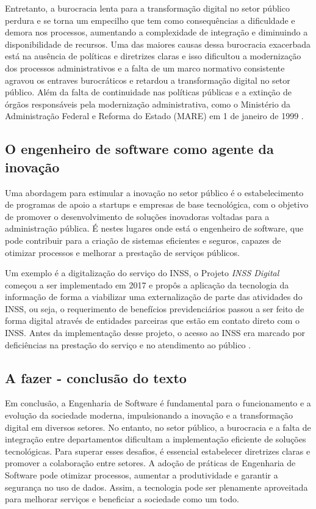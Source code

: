 \documentclass[12pt,oneside,a4paper,article]{abntex2}
\begin{document}
Entretanto, a burocracia lenta para a transformação digital no setor público perdura e se torna um empecilho que tem como consequências a dificuldade e demora nos processos, aumentando a complexidade de integração e diminuindo a disponibilidade de recursos. Uma das maiores causas dessa burocracia exacerbada está na ausência de políticas e diretrizes claras e isso dificultou a modernização dos processos administrativos e a falta de um marco normativo consistente agravou os entraves burocráticos e retardou a transformação digital no setor público. Além da falta de continuidade nas políticas públicas e a extinção de órgãos responsáveis pela modernização administrativa, como o Ministério da Administração Federal e Reforma do Estado (MARE) em 1 de janeiro de 1999 \cite{grin2015programa}.

\subsection{O engenheiro de software como agente da inovação}

Uma abordagem para estimular a inovação no setor público é o estabelecimento de programas de apoio a startups e empresas de base tecnológica, com o objetivo de promover o desenvolvimento de soluções inovadoras voltadas para a administração pública. É nestes lugares onde está o engenheiro de software, que pode contribuir para a criação de sistemas eficientes e seguros, capazes de otimizar processos e melhorar a prestação de serviços públicos.

Um exemplo é a digitalização do serviço do INSS, o Projeto \textit{INSS Digital} começou a ser implementado em 2017 e propôs a aplicação da tecnologia da informação de forma a viabilizar uma externalização de parte das atividades do INSS, ou seja, o requerimento de benefícios previdenciários passou a ser feito de forma digital através de entidades parceiras que estão em contato direto com o INSS. Antes da implementação desse projeto, o acesso ao INSS era marcado por deficiências na prestação do serviço e no atendimento ao público \cite{pinheiro2021transformaccao}.

\subsection{A fazer - conclusão do texto}

Em conclusão, a Engenharia de Software é fundamental para o funcionamento e a evolução da sociedade moderna, impulsionando a inovação e a transformação digital em diversos setores. No entanto, no setor público, a burocracia e a falta de integração entre departamentos dificultam a implementação eficiente de soluções tecnológicas. Para superar esses desafios, é essencial estabelecer diretrizes claras e promover a colaboração entre setores. A adoção de práticas de Engenharia de Software pode otimizar processos, aumentar a produtividade e garantir a segurança no uso de dados. Assim, a tecnologia pode ser plenamente aproveitada para melhorar serviços e beneficiar a sociedade como um todo.
\end{document}
